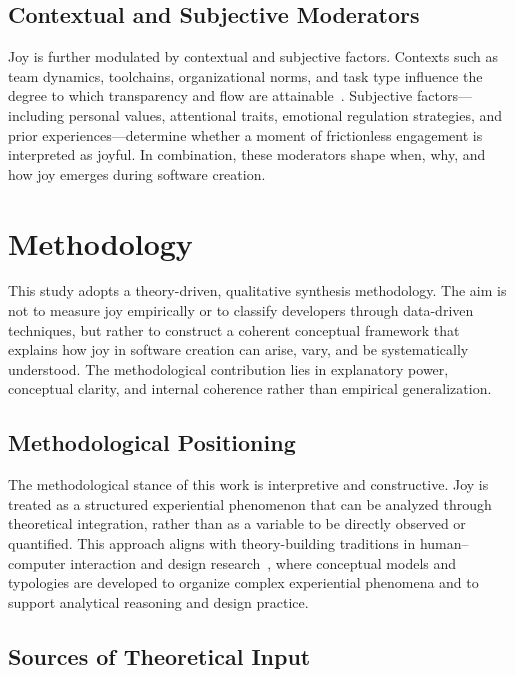 \documentclass[12pt]{elsarticle}
\begin{document}
\subsection{Contextual and Subjective Moderators}

Joy is further modulated by contextual and subjective factors. Contexts 
such as team dynamics, toolchains, organizational norms, and task type 
influence the degree to which transparency and flow are 
attainable~\cite{csikszentmihalyi1990}. Subjective factors---including 
personal values, attentional traits, emotional regulation strategies, and 
prior experiences---determine whether a moment of frictionless engagement 
is interpreted as joyful. In combination, these moderators shape when, 
why, and how joy emerges during software creation.

\section{Methodology}
\label{sec:methodology}

This study adopts a theory-driven, qualitative synthesis methodology. 
The aim is not to measure joy empirically or to classify developers 
through data-driven techniques, but rather to construct a coherent 
conceptual framework that explains how joy in software creation can 
arise, vary, and be systematically understood. The methodological 
contribution lies in explanatory power, conceptual clarity, and internal 
coherence rather than empirical generalization.

\subsection{Methodological Positioning}

The methodological stance of this work is interpretive and constructive. 
Joy is treated as a structured experiential phenomenon that can be 
analyzed through theoretical integration, rather than as a variable to 
be directly observed or quantified. This approach aligns with 
theory-building traditions in human--computer interaction and design 
research~\cite{cooper1999,pruitt2010}, where conceptual models and 
typologies are developed to organize complex experiential phenomena and 
to support analytical reasoning and design practice.

\subsection{Sources of Theoretical Input}
\end{document}
